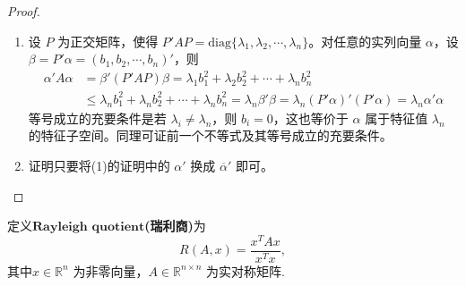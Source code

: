 \documentclass[../../main.tex]{subfiles}%
\begin{document}
\begin{proof}
\begin{enumerate}[(1)]
\item 设 \(P\) 为正交矩阵，使得 \(P'AP = \mathrm{diag}\{\lambda_1,\lambda_2,\cdots,\lambda_n\}\)。对任意的实列向量 \(\alpha\)，设 \(\beta = P'\alpha = (b_1,b_2,\cdots,b_n)'\)，则
\begin{align*}
\alpha'A\alpha &= \beta'(P'AP)\beta = \lambda_1b_1^2 + \lambda_2b_2^2 + \cdots + \lambda_nb_n^2\\
&\leqslant  \lambda_nb_1^2 + \lambda_nb_2^2 + \cdots + \lambda_nb_n^2 = \lambda_n\beta'\beta = \lambda_n(P'\alpha)'(P'\alpha) = \lambda_n\alpha'\alpha
\end{align*}
等号成立的充要条件是若 \(\lambda_i \neq \lambda_n\)，则 \(b_i = 0\)，这也等价于 \(\alpha\) 属于特征值 \(\lambda_n\) 的特征子空间。同理可证前一个不等式及其等号成立的充要条件。

\item 证明只要将(1)的证明中的 \(\alpha'\) 换成 \(\overline{\alpha}'\) 即可。
\end{enumerate}
\end{proof}

\begin{definition}
定义$\mathbf{Rayleigh}\,\,\mathbf{quotient}$\textbf{(瑞利商)}为
\[
R(A, x) = \frac{x^T A x}{x^T x},
\]
其中\( x \in \mathbb{R}^n \) 为非零向量，\( A \in \mathbb{R}^{n \times n} \) 为实对称矩阵.
\end{definition}
\end{document}
